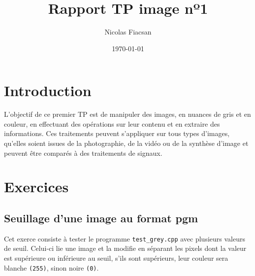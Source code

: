 \documentclass[11pt]{article}
\author{Nicolas Fiacsan}
\date{\today}
\title{Rapport TP image nº1}
\begin{document}
\maketitle

\section{Introduction}
L'objectif de ce premier TP est de manipuler des images, en nuances de gris et en couleur, en effectuant des opérations sur leur contenu et en extraire des informations. Ces traitements peuvent s'appliquer sur tous types d'images, qu'elles soient issues de la photographie, de la vidéo ou de la synthèse d'image et peuvent être comparés à des traitements de signaux.

\clearpage
\section{Exercices}
\subsection{Seuillage d'une image au format pgm}
Cet exerce consiste à tester le programme \texttt{test\_grey.cpp} avec plusieurs valeurs de seuil. Celui-ci lie une image et la modifie en séparant les pixels dont la valeur est supérieure ou inférieure au seuil, s'ils sont supérieurs, leur couleur sera blanche \texttt{(255)}, sinon noire \texttt{(0)}.
\end{document}
